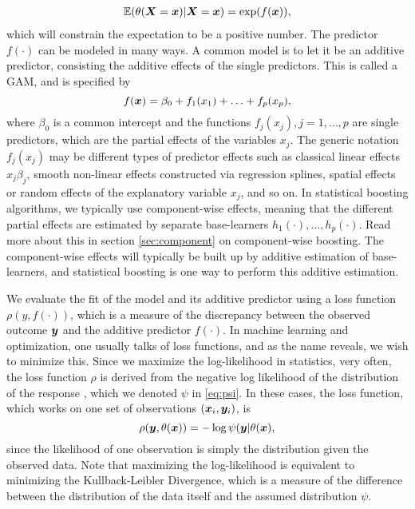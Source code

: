 \begin{align}
    \mathbb{E}(\theta(\bm{X}=\bm{x})|\bm{X}=\bm{x})=\exp(f(\bm{x})),
\end{align}
which will constrain the expectation to be a positive number.
The predictor $f(\cdot)$ can be modeled in many ways. A common model is to let it be an additive predictor, consisting the additive effects of the single predictors. This is called a GAM, and is specified by
\begin{equation}\label{eq:gam}
    f(\bm{x})=\beta_0+f_1(x_1)+\ldots+f_p(x_p),
\end{equation}
where $\beta_0$ is a common intercept and the functions $f_j(x_j),j=1,\ldots,p$ are single predictors, which are the partial effects of the variables $x_j$. The generic notation $f_j(x_j)$ may be different types of predictor effects such as classical linear effects $x_j\beta_j$, smooth non-linear effects constructed via regression splines, spatial effects or random effects of the explanatory variable $x_j$, and so on.%
In statistical boosting algorithms, we typically use component-wise effects, meaning that the different partial effects are estimated by separate base-learners $h_1(\cdot),\ldots,h_p(\cdot)$. Read more about this in section \ref{sec:component} on component-wise boosting. The component-wise effects will typically be built up by additive estimation of base-learners, and statistical boosting is one way to perform this additive estimation.

We evaluate the fit of the model and its additive predictor using a loss function $\rho(y,f(\cdot))$, which is a measure of the discrepancy between the observed outcome $\bm{y}$ and the additive predictor $f(\cdot)$. In machine learning and optimization, one usually talks of loss functions, and as the name reveals, we wish to minimize this. Since we maximize the log-likelihood in statistics, very often, the loss function $\rho$ is derived from the negative log likelihood of the distribution of the response \citep{mayr14a, bovelstadborgan}, which we denoted $\psi$ in \eqref{eq:psi}. In these cases, the loss function, which works on one set of observations $(\bm{x}_i,\bm{y}_i)$, is
\begin{equation}
    \rho(\bm{y},\theta(\bm{x}))=-\log{\psi(\bm{y}|\theta(\bm{x})},
\end{equation}
since the likelihood of one observation is simply the distribution given the observed data. Note that maximizing the log-likelihood is equivalent to minimizing the Kullback-Leibler Divergence, which is a measure of the difference between the distribution of the data itself and the assumed distribution $\psi$. 

